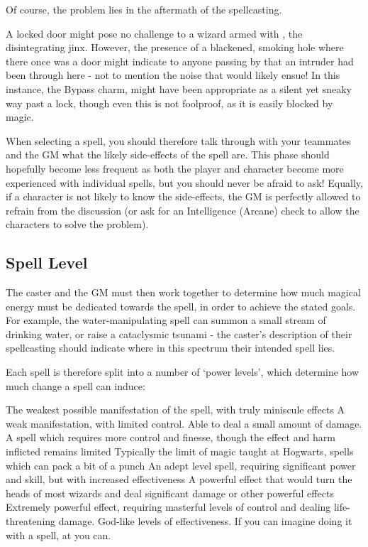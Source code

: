 Of course, the problem lies in the aftermath of the spellcasting. 

A locked door might pose no challenge to a wizard armed with , the disintegrating jinx. However, the presence of a blackened, smoking hole where there once was a door might indicate to anyone passing by that an intruder had been through here - not to mention the noise that would likely ensue! In this instance, the Bypass charm,  might have been appropriate as a silent yet sneaky way past a lock, though even this is not foolproof, as it is easily blocked by magic. 

When selecting a spell, you should therefore talk through with your teammates and the GM what the likely side-effects of the spell are. This phase should hopefully become less frequent as both the player and character become more experienced with individual spells, but you should never be afraid to ask! Equally, if a character is not likely to know the side-effects, the GM is perfectly allowed to refrain from the discussion (or ask for an Intelligence (Arcane) check to allow the characters to solve the problem). 


\subsection{Spell Level}

The caster and the GM must then work together to determine how much magical energy must be dedicated towards the spell, in order to achieve the stated goals. For example, the water-manipulating spell  can summon a small stream of drinking water, or raise a cataclysmic tsunami - the caster's description of their spellcasting should indicate where in this spectrum their intended spell lies. 

Each spell is therefore split into a number of `power levels', which determine how much change a spell can induce:

\extendedRatingTable
{{\levelZero}{The weakest possible manifestation of the spell, with truly miniscule effects}}
{{\levelOne}{A weak manifestation, with limited control. Able to deal a small amount of damage.}}
{{\levelTwo}{A spell which requires more control and finesse, though the effect and harm inflicted remains limited}}
{{\levelThree}{Typically the limit of magic taught at Hogwarts, spells which can pack a bit of a punch}}
{{\levelFour}{An adept level spell, requiring significant power and skill, but with increased effectiveness}}
{{\levelFive}{A powerful effect that would turn the heads of most wizards and deal significant damage or other powerful effects}}
{{\levelSix}{Extremely powerful effect, requiring masterful levels of control and dealing life-threatening damage.}}
{{\levelSeven}{God-like levels of effectiveness. If you can imagine doing it with a spell, at \levelSeven{} you can.}}

